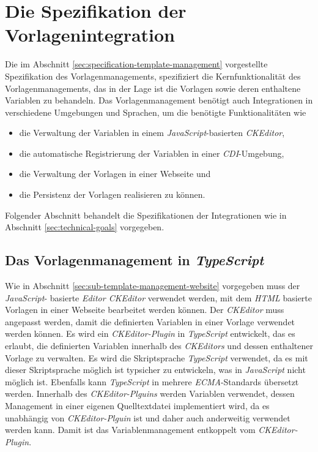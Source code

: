 \section{Die Spezifikation der Vorlagenintegration}
Die im Abschnitt \ref{sec:specification-template-management} vorgestellte Spezifikation des Vorlagenmanagements, spezifiziert die Kernfunktionalität des Vorlagenmanagements, das in der Lage ist die Vorlagen sowie deren enthaltene Variablen zu behandeln. Das Vorlagenmanagement benötigt auch Integrationen in verschiedene Umgebungen und Sprachen, um die benötigte Funktionalitäten wie
\begin{itemize}
	\item die Verwaltung der Variablen in einem \emph{JavaScript}-basierten \emph{CKEditor},
	\item die automatische Registrierung der Variablen in einer \emph{CDI}-Umgebung,
	\item die Verwaltung der Vorlagen in einer Webseite und
	\item die Persistenz der Vorlagen realisieren zu können. 
\end{itemize}
Folgender Abschnitt behandelt die Spezifikationen der Integrationen wie in Abschnitt \ref{sec:technical-goals} vorgegeben. 
 
\subsection{Das Vorlagenmanagement in \emph{TypeScript}}
\label{sec:sub-typescript-javascript}
Wie in Abschnitt \ref{sec:sub-template-management-website} vorgegeben muss der \emph{JavaScript}- basierte \emph{Editor CKEditor} verwendet werden, mit dem \emph{HTML} basierte Vorlagen in einer Webseite bearbeitet werden können. Der \emph{CKEditor} muss angepasst werden, damit die definierten Variablen in einer Vorlage verwendet werden können. Es wird ein \emph{CKEditor-Plugin} in \emph{TypeScript} entwickelt, das es erlaubt, die definierten Variablen innerhalb des \emph{CKEditors} und dessen enthaltener Vorlage zu verwalten. Es wird die Skriptsprache \emph{TypeScript} verwendet, da es mit dieser Skriptsprache möglich ist typsicher zu entwickeln, was in \emph{JavaScript} nicht möglich ist. Ebenfalls kann \emph{TypeScript} in mehrere \emph{ECMA}-Standards übersetzt werden.
\newline
\newline
Innerhalb des \emph{CKEditor-Plguins} werden Variablen verwendet, dessen Management in einer eigenen Quelltextdatei implementiert wird, da es unabhängig von \emph{CKEditor-Plguin} ist und daher auch anderweitig verwendet werden kann. Damit ist das Variablenmanagement entkoppelt vom \emph{CKEditor-Plugin}.

